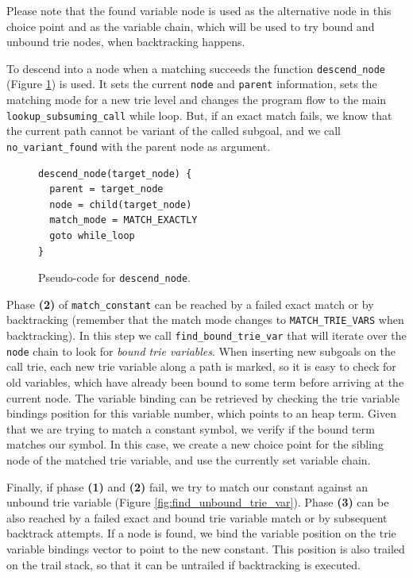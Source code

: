 Please note that the found variable node is used as the alternative node in this choice point
and as the variable chain, which will be used to try bound and unbound trie nodes, when backtracking happens.

To descend into a node when a matching succeeds the function \texttt{descend\_node} (Figure \ref{fig:descend_node})
is used. It sets the current \texttt{node} and \texttt{parent} information, sets the matching mode for a new trie level
and changes the program flow to the main \texttt{lookup\_subsuming\_call} while loop. But,
if an exact match fails, we know that the current path cannot be variant of the called subgoal, and we call
\texttt{no\_variant\_found} with the parent node as argument.

\begin{figure}[ht]
\begin{Verbatim}[fontsize=\small]
descend_node(target_node) {
  parent = target_node
  node = child(target_node)
  match_mode = MATCH_EXACTLY
  goto while_loop
}
\end{Verbatim}
\caption{Pseudo-code for \texttt{descend\_node}.}
\label{fig:descend_node}
\end{figure}

Phase \textbf{(2)} of \texttt{match\_constant} can be reached by a failed exact match or by backtracking
(remember that the match mode changes to \texttt{MATCH\_TRIE\_VARS} when backtracking). In this step
we call \texttt{find\_bound\_trie\_var} that will iterate over the \texttt{node} chain to look for
\textit{bound trie variables}. When inserting new subgoals on the call trie, each new trie variable
along a path is marked, so it is easy to check for old variables, which have already been bound
to some term before arriving at the current node. The variable binding can be retrieved by
checking the trie variable bindings position for this variable number, which points to an heap term.
Given that we are trying to match a constant symbol, we verify if the bound term matches our symbol.
In this case, we create a new choice point for the sibling node of the matched trie variable, and use
the currently set variable chain.

Finally, if phase \textbf{(1)} and \textbf{(2)} fail, we try to match our constant against an unbound trie variable
(Figure \ref{fig:find_unbound_trie_var}).
Phase \textbf{(3)} can be also reached by a failed exact and bound trie variable match or by subsequent backtrack
attempts. If a node is found, we bind the variable position on the trie variable bindings
vector to point to the new constant. This position is also trailed on the trail stack, so that it can be untrailed
if backtracking is executed.

